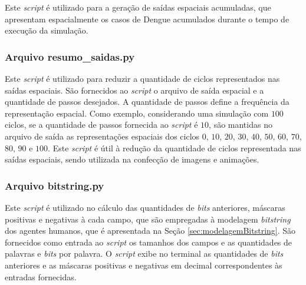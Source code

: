 Este \textit{script} é utilizado para a geração de saídas espaciais acumuladas, que apresentam espacialmente os casos de Dengue acumulados durante o tempo de execução da simulação.



\newpage

\subsubsection{Arquivo resumo\_saidas.py}

Este \textit{script} é utilizado para reduzir a quantidade de ciclos representados nas saídas espaciais. São fornecidos ao \textit{script} o arquivo de saída espacial e a quantidade de passos desejados. A quantidade de passos define a frequência da representação espacial. Como exemplo, considerando uma simulação com $100$ ciclos, se a quantidade de passos fornecida ao \textit{script} é $10$, são mantidas no arquivo de saída as representações espaciais dos ciclos $0$, $10$, $20$, $30$, $40$, $50$, $60$, $70$, $80$, $90$ e $100$. Este \textit{script} é útil à redução da quantidade de ciclos representada nas saídas espaciais, sendo utilizada na confecção de imagens e animações. 



\newpage

\subsubsection{Arquivo bitstring.py}

Este \textit{script} é utilizado no cálculo das quantidades de \textit{bits} anteriores, máscaras positivas e negativas à cada campo, que são empregadas à modelagem \textit{bitstring} dos agentes humanos, que é apresentada na Seção \ref{sec:modelagemBitstring}. São fornecidos como entrada ao \textit{script} os tamanhos dos campos e as quantidades de palavras e \textit{bits} por palavra. O \textit{script} exibe no terminal as quantidades de \textit{bits} anteriores e as máscaras positivas e negativas em decimal correspondentes às entradas fornecidas. 



\newpage
